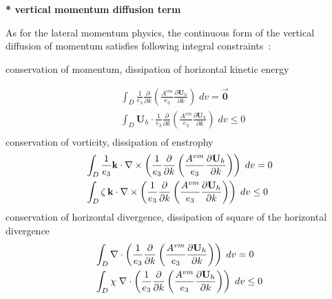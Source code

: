 \textbf{* vertical momentum diffusion term}

As for the lateral momentum physics, the continuous form of the vertical 
diffusion of momentum satisfies following integral constraints~:

conservation of momentum, dissipation of horizontal kinetic energy

\begin{equation} \label{Eq_dynzdf_dyn}
\begin{aligned}
& \int_D {\frac{1}{e_3 }}  \frac{\partial }{\partial k}\left( \frac{A^{vm}}{e_3 }\frac{\partial {\textbf{U}}_h }{\partial k} \right) \;dv = \overrightarrow{\textbf{0}} \\ 
& \int_D \textbf{U}_h \cdot \frac{1}{e_3} \frac{\partial}{\partial k} \left( {\frac{A^{vm}}{e_3 }}{\frac{\partial \textbf{U}_h }{\partial k}} \right) \;dv \leq 0 \\ 
 \end{aligned} 
 \end{equation}
conservation of vorticity, dissipation of enstrophy
\begin{equation} \label{Eq_dynzdf_vor}
\begin{aligned}
& \int_D {\frac{1}{e_3 }{\rm {\bf k}}\cdot \nabla \times \left( {\frac{1}{e_3 
}\frac{\partial }{\partial k}\left( {\frac{A^{vm}}{e_3 }\frac{\partial {\rm 
{\bf U}}_h }{\partial k}} \right)} \right)\;dv} =0 \\ 
& \int_D {\zeta \,{\rm {\bf k}}\cdot \nabla \times \left( {\frac{1}{e_3 
}\frac{\partial }{\partial k}\left( {\frac{A^{vm}}{e_3 }\frac{\partial {\rm 
{\bf U}}_h }{\partial k}} \right)} \right)\;dv} \leq 0 \\ 
\end{aligned}
\end{equation}
conservation of horizontal divergence, dissipation of square of the 
horizontal divergence
\begin{equation} \label{Eq_dynzdf_div}
\begin{aligned}
 &\int_D {\nabla \cdot \left( {\frac{1}{e_3 }\frac{\partial }{\partial 
k}\left( {\frac{A^{vm}}{e_3 }\frac{\partial {\rm {\bf U}}_h }{\partial k}} 
\right)} \right)\;dv} =0 \\ 
& \int_D {\chi \;\nabla \cdot \left( {\frac{1}{e_3 }\frac{\partial }{\partial 
k}\left( {\frac{A^{vm}}{e_3 }\frac{\partial {\rm {\bf U}}_h }{\partial k}} 
\right)} \right)\;dv} \leq 0 \\ 
\end{aligned}
\end{equation}

